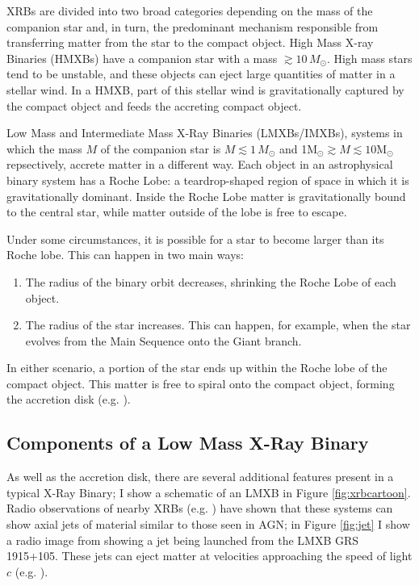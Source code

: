 \par XRBs are divided into two broad categories depending on the mass of the companion star and, in turn, the predominant mechanism responsible from transferring matter from the star to the compact object.  High Mass X-ray Binaries (HMXBs) have a companion star with a mass $\gtrsim10\,M_\odot$.  High mass stars tend to be unstable, and these objects can eject large quantities of matter in a stellar wind.  In a HMXB, part of this stellar wind is gravitationally captured by the compact object and feeds the accreting compact object.
\par Low Mass and Intermediate Mass X-Ray Binaries (LMXBs/IMXBs), systems in which the mass $M$ of the companion star is $M\lesssim1\,M_\odot$ and 1M$_\odot\gtrsim M\lesssim10$M$_\odot$ repsectively, accrete matter in a different way.  Each object in an astrophysical binary system has a Roche Lobe: a teardrop-shaped region of space in which it is gravitationally dominant.  Inside the Roche Lobe matter is gravitationally bound to the central star, while matter outside of the lobe is free to escape.
\par Under some circumstances, it is possible for a star to become larger than its Roche lobe.  This can happen in two main ways:
\begin{enumerate}
\item The radius of the binary orbit decreases, shrinking the Roche Lobe of each object.
\item The radius of the star increases.  This can happen, for example, when the star evolves from the Main Sequence onto the Giant branch.
\end{enumerate}
In either scenario, a portion of the star ends up within the Roche lobe of the compact object.  This matter is free to spiral onto the compact object, forming the accretion disk (e.g. \citealp{Lewin_SSRev}).

\subsection{Components of a Low Mass X-Ray Binary}

\par As well as the accretion disk, there are several additional features present in a typical X-Ray Binary; I show a schematic of an LMXB in Figure \ref{fig:xrbcartoon}.   Radio observations of nearby XRBs (e.g. \citealp{Mirabel_Microquasar,Geldzahler_Jet}) have shown that these systems can show axial jets of material similar to those seen in AGN; in Figure \ref{fig:jet} I show a radio image from \citet{Fender_1915} showing a jet being launched from the LMXB GRS 1915+105. These jets can eject matter at velocities approaching the speed of light $c$ (e.g. \citealp{Mirabel_Microquasar}).

